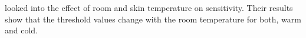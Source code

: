 \cite{hirosawa} looked into the effect of room and skin temperature on sensitivity.
Their results show that the threshold values change with the room temperature for both, warm and cold.







































